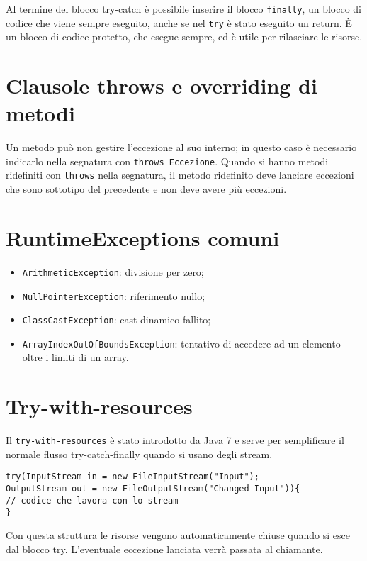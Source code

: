 Al termine del blocco try-catch è possibile inserire il blocco \texttt{finally}, un blocco di codice che viene sempre eseguito, anche se nel \texttt{try} è stato eseguito un return. È un blocco di codice protetto, che esegue sempre, ed è utile per rilasciare le risorse.

\section{Clausole throws e overriding di metodi}
Un metodo può non gestire l'eccezione al suo interno; in questo caso è necessario indicarlo nella segnatura con \texttt{throws Eccezione}.
Quando si hanno metodi ridefiniti con \texttt{throws} nella segnatura, il metodo ridefinito deve lanciare eccezioni che sono sottotipo del precedente e non deve avere più eccezioni. 

\section{RuntimeExceptions comuni}
\begin{itemize}
\item \texttt{ArithmeticException}: divisione per zero;
\item \texttt{NullPointerException}: riferimento nullo;
\item \texttt{ClassCastException}: cast dinamico fallito;
\item \texttt{ArrayIndexOutOfBoundsException}: tentativo di accedere ad un elemento oltre i limiti di un array.
\end{itemize}

\section{Try-with-resources}
Il \texttt{try-with-resources} è stato introdotto da Java 7 e serve per semplificare il normale flusso try-catch-finally quando si usano degli stream. 
\begin{lstlisting}
try(InputStream in = new FileInputStream("Input");
OutputStream out = new FileOutputStream("Changed-Input")){
// codice che lavora con lo stream
}
\end{lstlisting}
Con questa struttura le risorse vengono automaticamente chiuse quando si esce dal blocco try. L'eventuale eccezione lanciata verrà passata al chiamante.
